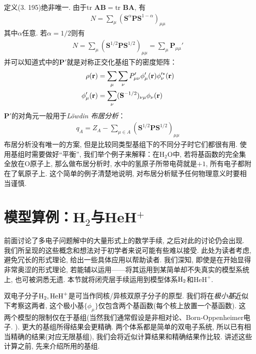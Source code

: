 定义(3.
195)绝非唯一. 
由于$\mathrm{tr}\,\,\mathbf{AB}=\mathrm{tr}\,\,\mathbf{BA}$, 
有
\begin{align}
	N = \sum_\mu (\mathbf{S}^\alpha\mathbf{PS}^{1-\alpha})_{\mu\mu}
\end{align}
其中$\alpha$任意. 
若$\alpha=1/2$则有
\begin{align}
	\label{3.198}
	N = \sum_\mu (\mathbf{S}^{1/2}\mathbf{PS}^{1/2})_{\mu\mu} = \sum_\mu \mathbf{P}_{\mu\mu}'
\end{align}
并可以知道式中的$\mathbf{P}'$就是对称正交化基组下的密度矩阵：
\begin{align}
	\rho(\mathbf{r}) &= \sum_\mu\sum_\nu P'_{\mu\nu}\phi_\mu'(\mathbf{r})\phi_\nu^{\prime *}(\mathbf{r})\\
	\phi'_{\mu}(\mathbf{r}) &= \sum_\nu(\mathbf{S}^{-1/2})_{\nu\mu}\phi_\nu(\mathbf{r})
\end{align}
$\mathbf{P}'$的对角元一般用于\emph{L\"owdin 布居分析}：
\begin{align}
	q_A = Z_A - \sum_{\mu\in A}(\mathbf{S}^{1/2}\mathbf{PS}^{1/2})_{\mu\mu}
\end{align}
布居分析没有唯一的方案, 
但是比较同类型基组下的不同分子时它们都很有用. 
使用基组时需要做好``平衡'', 
我们举个例子来解释：在$\mathrm{H}_2\mathrm{O}$中, 
若将基函数的完全集全放在$\mathrm{O}$原子上, 
那么做布居分析时, 
水中的氢原子所带电荷就是$+1$, 
所有电子都附在了氧原子上. 
这个简单的例子清楚地说明,
对布居分析赋予任何物理意义时要相当谨慎.

\section{模型算例：H$_2$与HeH$^+$}
前面讨论了多电子问题解中的大量形式上的数学手续, 
之后对此的讨论仍会出现. 
我们所呈现的这些概念和想法对于初学者来说可能有些难以接受. 
此处为读者考虑, 
避免冗长的形式理论, 
给出一些具体应用以帮助读者. 
我们深知, 
即使是在开始显得非常奥涩的形式理论, 
若能辅以运用——将其运用到某简单却不失真实的模型系统上, 
也可被洞悉无遗. 
本节就将闭壳层\hft 手续运用到模型体系$\mathrm{H}_2$和$\mathrm{HeH}^+$.


双电子分子$\mathrm{H}_2,\mathrm{HeH}^+$是可当作同核/异核双原子分子的原型. 
我们将在\emph{极小基}近似下考察这两者, 
这个极小基$\{\phi_\mu\}$仅包含两个基函数(每个核上放置一个基函数). 
这两个模型的限制仅在于基组(当然我们通常假设是非相对论、Born-Oppenheimer电子\ha.
). 
更大的基组所得结果会更精确. 
两个体系都是简单的双电子系统, 
所以已有相当精确的结果(对应无限基组), 
我们会将近似计算结果和精确结果作比较. 
讲述这些计算之前, 
先来介绍所用的基组.

